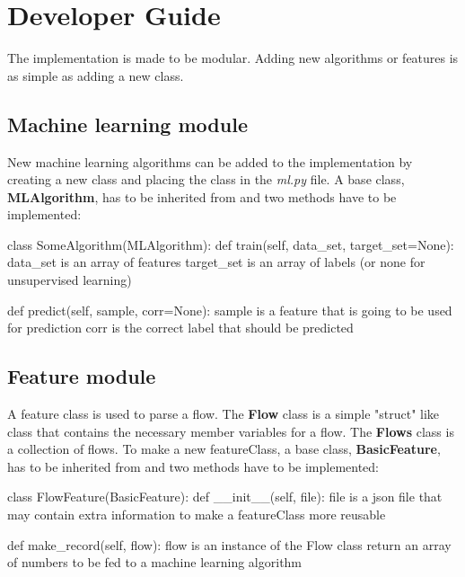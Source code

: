 
\chapter{Developer Guide} %
\label{framework}
The implementation is made to be modular. Adding new algorithms or features is as simple as adding a new class. 

\section{Machine learning module}
New machine learning algorithms can be added to the implementation by creating a new class and placing the class in the \textit{ml.py} file. A base class, \textbf{MLAlgorithm}, has to be inherited from and two methods have to be implemented: \\
\begin{python}
class SomeAlgorithm(MLAlgorithm):
    def train(self, data_set, target_set=None):
        data_set is an array of features
        target_set is an array of labels
            (or none for unsupervised learning)

    def predict(self, sample, corr=None):
        sample is a feature that is going 
            to be used for prediction
        corr is the correct label that 
            should be predicted
\end{python}

\section{Feature module}
A feature class is used to parse a flow. The \textbf{Flow} class is a simple "struct" like class that contains the necessary member variables for a flow. The \textbf{Flows} class is a collection of flows. To make a new featureClass, a base class, \textbf{BasicFeature}, has to be inherited from and two methods have to be implemented:\\

\begin{python}
class FlowFeature(BasicFeature):
    def __init__(self, file):
        file is a json file that may contain extra 
        information to make a featureClass 
        more reusable
        
    def make_record(self, flow):
        flow is an instance of the Flow class
        return an array of numbers to be fed 
            to a machine learning algorithm
\end{python}

